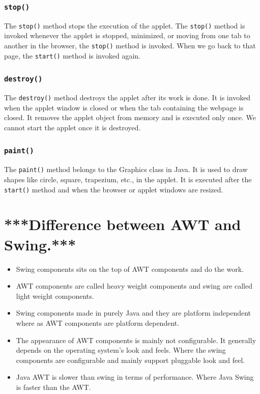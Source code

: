 \documentclass[twocolumn, a4paper]{article}
\begin{document}
\subsubsection{\texttt{stop()}}
The \verb+stop()+ method stops the execution of the applet. The \verb+stop()+
method is invoked whenever the applet is stopped, minimized, or moving from
one tab to another in the browser, the \verb+stop()+ method is invoked. When
we go back to that page, the \verb+start()+ method is invoked again.

\subsubsection{\texttt{destroy()}}
The \verb+destroy()+ method destroys the applet after its work is done. It is
invoked when the applet window is closed or when the tab containing the
webpage is closed. It removes the applet object from memory and is executed
only once. We cannot start the applet once it is destroyed.

\subsubsection{\texttt{paint()}}
The \verb+paint()+ method belongs to the Graphics class in Java. It is used to
draw shapes like circle, square, trapezium, etc., in the applet. It is
executed after the \verb+start()+ method and when the browser or applet
windows are resized.

\section{***Difference between AWT and Swing.***}
\begin{itemize}
  \item Swing components sits on the top of AWT components and do the work.
  \item AWT components are called heavy weight components and swing are called
    light weight components.
  \item Swing components made in purely Java and they are platform independent
    where as AWT components are platform dependent.
  \item The appearance of AWT components is mainly not configurable. It
    generally depends on the operating system’s look and feels. Where the
    swing components are configurable and mainly support pluggable look and
    feel.
  \item Java AWT is slower than swing in terms of performance. Where Java
    Swing is faster than the AWT.
\end{itemize}
\end{document}
